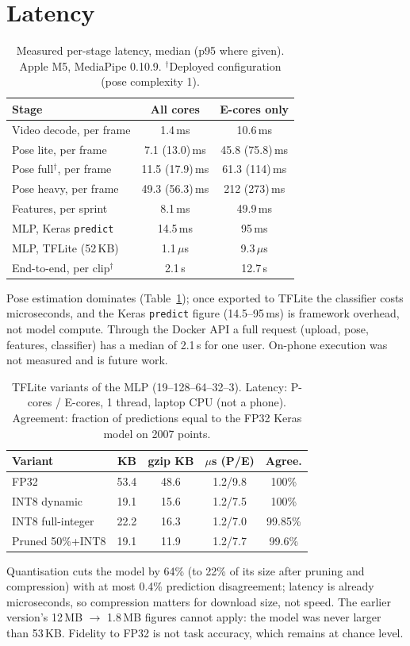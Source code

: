 \documentclass[conference]{IEEEtran}
\begin{document}
\section{Latency}\label{sec:latency}
\begin{table}[t]
\caption{Measured per-stage latency, median (p95 where given). Apple M5, MediaPipe 0.10.9. $^\dagger$Deployed configuration (pose complexity 1).}
\label{tab:lat}
\centering\small
\setlength{\tabcolsep}{4pt}
\begin{tabular}{lcc}
\toprule
Stage & All cores & E-cores only\\
\midrule
Video decode, per frame & 1.4\,ms & 10.6\,ms\\
Pose lite, per frame & 7.1 (13.0)\,ms & 45.8 (75.8)\,ms\\
Pose full$^\dagger$, per frame & 11.5 (17.9)\,ms & 61.3 (114)\,ms\\
Pose heavy, per frame & 49.3 (56.3)\,ms & 212 (273)\,ms\\
Features, per sprint & 8.1\,ms & 49.9\,ms\\
MLP, Keras \texttt{predict} & 14.5\,ms & 95\,ms\\
MLP, TFLite (52\,KB) & 1.1\,$\mu$s & 9.3\,$\mu$s\\
End-to-end, per clip$^\dagger$ & 2.1\,s & 12.7\,s\\
\bottomrule
\end{tabular}
\end{table}
Pose estimation dominates (Table~\ref{tab:lat}); once exported to TFLite the classifier costs microseconds, and the Keras \texttt{predict} figure (14.5--95\,ms) is framework overhead, not model compute. Through the Docker API a full request (upload, pose, features, classifier) has a median of 2.1\,s for one user. On-phone execution was not measured and is future work.


\begin{table}[t]
\caption{TFLite variants of the MLP (19--128--64--32--3). Latency: P-cores / E-cores, 1 thread, laptop CPU (not a phone). Agreement: fraction of predictions equal to the FP32 Keras model on 2007 points.}
\label{tab:comp}
\centering\footnotesize
\setlength{\tabcolsep}{3pt}
\begin{tabular}{lcccc}
\toprule
Variant & KB & gzip KB & $\mu$s (P/E) & Agree.\\
\midrule
FP32 & 53.4 & 48.6 & 1.2/9.8 & 100\%\\
INT8 dynamic & 19.1 & 15.6 & 1.2/7.5 & 100\%\\
INT8 full-integer & 22.2 & 16.3 & 1.2/7.0 & 99.85\%\\
Pruned 50\%+INT8 & 19.1 & 11.9 & 1.2/7.7 & 99.6\%\\
\bottomrule
\end{tabular}
\end{table}
Quantisation cuts the model by 64\% (to 22\% of its size after pruning and compression) with at most 0.4\% prediction disagreement; latency is already microseconds, so compression matters for download size, not speed. The earlier version's 12\,MB $\rightarrow$ 1.8\,MB figures cannot apply: the model was never larger than 53\,KB. Fidelity to FP32 is not task accuracy, which remains at chance level.
\end{document}

